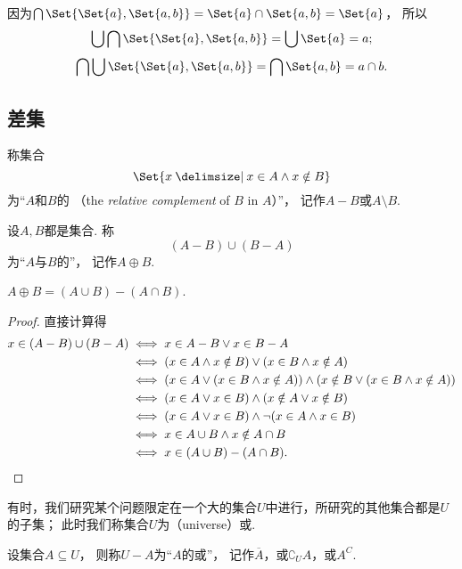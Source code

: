 \begin{example}
因为\(\bigcap\Set{ \Set{a}, \Set{a,b} } = \Set{a} \cap \Set{a,b} = \Set{a}\)，%
所以\[
\bigcup \bigcap \Set{ \Set{a}, \Set{a,b} } = \bigcup \Set{a} = a;
\]\[
\bigcap \bigcup \Set{ \Set{a}, \Set{a,b} } = \bigcap \Set{a,b} = a \cap b.
\]
\end{example}

\subsection{差集}
\begin{definition}
称集合\[
	\Set{ x \given x \in A \land x \notin B }
\]为“\(A\)和\(B\)的%
（the \emph{relative complement} of \(B\) in \(A\)）”，
记作\(A - B\)或\(A \setminus B\).
\end{definition}

\begin{definition}
设\(A,B\)都是集合.
称\[
	(A-B)\cup(B-A)
\]为“\(A\)与\(B\)的”，
记作\(A \oplus B\).
\end{definition}

\begin{theorem}
\(A \oplus B = (A \cup B)-(A \cap B)\).
\begin{proof}
直接计算得
\begin{align*}
	x\in(A-B)\cup(B-A)
	&\iff x \in A-B \lor x \in B-A \\
	&\iff (x \in A \land x \notin B) \lor (x \in B \land x \notin A) \\
	&\iff (x \in A \lor (x \in B \land x \notin A)) \land (x \notin B \lor (x \in B \land x \notin A)) \\
	&\iff (x \in A \lor x \in B) \land (x \notin A \lor x \notin B) \\
	&\iff (x \in A \lor x \in B) \land \neg(x \in A \land x \in B) \\
	&\iff x \in A \cup B \land x \notin A \cap B \\
	&\iff x\in(A \cup B)-(A \cap B).
	\qedhere
\end{align*}
\end{proof}
\end{theorem}

\begin{definition}[全集、补集]
有时，我们研究某个问题限定在一个大的集合\(U\)中进行，所研究的其他集合都是\(U\)的子集；
此时我们称集合\(U\)为（universe）或.

设集合\(A \subseteq U\)，
则称\(U-A\)为“\(A\)的或”，
记作\(\overline{A}\)，或\(\complement_U A\)，或\(A^C\).
\end{definition}

